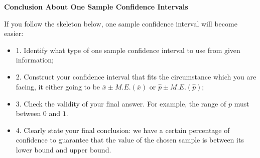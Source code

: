 \noindent
\textbf{Conclusion About One Sample Confidence Intervals}

\noindent
If you follow the skeleton below, one sample confidence interval will become easier:

\begin{itemize}
	\item 1. Identify what type of one sample confidence interval to use from given information;
	\item 2. Construct your confidence interval that fits the circumstance which you are facing, it either going to be $\bar{x}  \pm M.E.(\bar{x})\text{ or } \hat{p}  \pm M.E.(\hat{p});$
	\item 3. Check the validity of your final answer. For example, the range of $p$ must between $0$ and $1$.
	\item 4. Clearly state your final conclusion: we have a certain percentage of confidence to guarantee that the value of the chosen sample is between its lower bound and upper bound.
\end{itemize}
